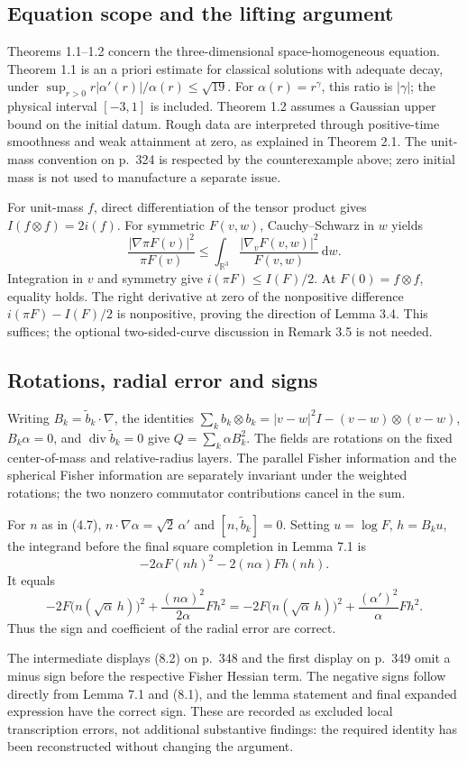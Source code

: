 \documentclass[10pt]{article}
\begin{document}
\subsection*{Equation scope and the lifting argument}
Theorems 1.1–1.2 concern the three-dimensional space-homogeneous equation. Theorem 1.1 is an a priori estimate for classical solutions with adequate decay, under \(\sup_{r>0}r|\alpha'(r)|/\alpha(r)\leq\sqrt{19}\). For \(\alpha(r)=r^\gamma\), this ratio is \(|\gamma|\); the physical interval \([-3,1]\) is included. Theorem 1.2 assumes a Gaussian upper bound on the initial datum. Rough data are interpreted through positive-time smoothness and weak attainment at zero, as explained in Theorem 2.1. The unit-mass convention on p. 324 is respected by the counterexample above; zero initial mass is not used to manufacture a separate issue.\par
For unit-mass \(f\), direct differentiation of the tensor product gives \(I(f\otimes f)=2i(f)\). For symmetric \(F(v,w)\), Cauchy–Schwarz in \(w\) yields \[\frac{|\nabla\pi F(v)|^2}{\pi F(v)}
 \leq \int_{\mathbb R^3}\frac{|\nabla_vF(v,w)|^2}{F(v,w)}\,\mathrm dw.\] Integration in \(v\) and symmetry give \(i(\pi F)\leq I(F)/2\). At \(F(0)=f\otimes f\), equality holds. The right derivative at zero of the nonpositive difference \(i(\pi F)-I(F)/2\) is nonpositive, proving the direction of Lemma 3.4. This suffices; the optional two-sided-curve discussion in Remark 3.5 is not needed.\par
\subsection*{Rotations, radial error and signs}
Writing \(B_k=\widetilde b_k\cdot\nabla\), the identities \(\sum_k b_k\otimes b_k=|v-w|^2 I-(v-w)\otimes(v-w)\), \(B_k\alpha=0\), and \(\operatorname{div}\widetilde b_k=0\) give \(Q=\sum_k\alpha B_k^2\). The fields are rotations on the fixed center-of-mass and relative-radius layers. The parallel Fisher information and the spherical Fisher information are separately invariant under the weighted rotations; the two nonzero commutator contributions cancel in the sum.\par
For \(n\) as in (4.7), \(n\cdot\nabla\alpha=\sqrt2\,\alpha'\) and \([n,\widetilde b_k]=0\). Setting \(u=\log F\), \(h=B_k u\), the integrand before the final square completion in Lemma 7.1 is \[-2\alpha F(nh)^2-2(n\alpha)Fh(nh).\] It equals \[-2F\bigl(n(\sqrt\alpha\,h)\bigr)^2+
 \frac{(n\alpha)^2}{2\alpha}Fh^2
 =
 -2F\bigl(n(\sqrt\alpha\,h)\bigr)^2+
 \frac{(\alpha')^2}{\alpha}Fh^2.\] Thus the sign and coefficient of the radial error are correct.\par
The intermediate displays (8.2) on p. 348 and the first display on p. 349 omit a minus sign before the respective Fisher Hessian term. The negative signs follow directly from Lemma 7.1 and (8.1), and the lemma statement and final expanded expression have the correct sign. These are recorded as excluded local transcription errors, not additional substantive findings: the required identity has been reconstructed without changing the argument.\par
\end{document}

